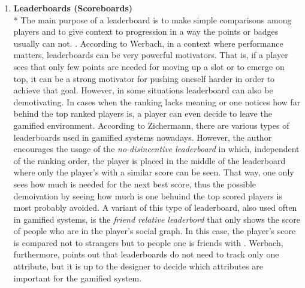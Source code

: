 \begin{enumerate}
\item \textbf{Leaderboards (Scoreboards)}\\*
The main purpose of a leaderboard is to make simple comparisons among players and to give context to progression in a way the points or badges usually can not. \cite{zichermann2011gamification, werbach2012win}. According to Werbach, in a context where performance matters, leaderboards can be very powerful motivators. That is, if a player sees that only few points are needed for moving up a slot or to emerge on top, it can be a strong motivator for pushing oneself harder in order to achieve that goal. However, in some situations leaderboard can also be demotivating. In cases when the ranking lacks meaning or one notices how far behind the top ranked players is, a player can even decide to leave the gamified environment. According to Zichermann, there are various types of leaderboards used in gamified systems nowadays\cite{zichermann2011gamification}. However, the author encourages the usage of the \textit{no-disincentive leaderboard} in which, independent of the ranking order, the player is placed in the middle of the leaderboard where only the player's with a similar score can be seen. That way, one only sees how much is needed for the next best score, thus the possible demoivation by seeing how much is one behuind the top scored players is most probably avoided. A variant of this type of leaderboard, also used often in gamified systems, is the \textit{friend relative leaderbord} that only shows the score of people who are in the player's social graph. In this case, the player's score is compared not to strangers but to people one is friends with \cite{WerbachCoursera}. Werbach, furthermore, points out that leaderboards do not need to track only one attribute, but it is up to the designer to decide which attributes are important for the gamified system. 
\end{enumerate}
